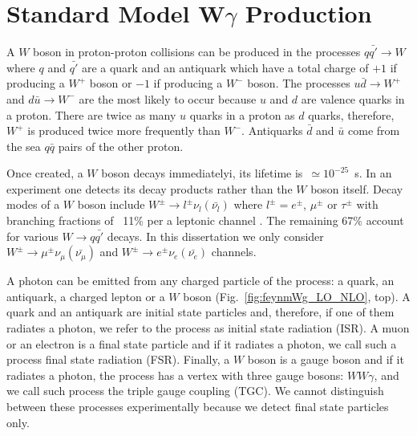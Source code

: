 \section{Standard Model W$\gamma$ Production}
\label{sec:WgAbout_SMproduction}

A $W$ boson in proton-proton collisions can be produced in the processes $q {\bar{q'}} \rightarrow W$ where $q$ and $\bar{q'}$ are a quark and an antiquark which have a total charge of $+1$ if producing a $W^+$ boson or $-1$ if producing a $W^-$ boson. The processes $u\bar{d}\rightarrow W^+$ and $d\bar{u}\rightarrow W^-$ are the most likely to occur because $u$ and $d$ are valence quarks in a proton. There are twice as many $u$ quarks in a proton as $d$ quarks, therefore, $W^+$ is produced twice more frequently than $W^-$. Antiquarks $\bar{d}$ and $\bar{u}$ come from the sea $q\bar{q}$ pairs of the other proton.

Once created, a $W$ boson decays immediatelyi, its lifetime is~$\simeq 10^{-25}$~s. In an experiment one detects its decay products rather than the $W$ boson itself. Decay modes of a $W$ boson include $W^\pm \rightarrow l^\pm \nu_l ({\bar{\nu_l}})$ where $l^\pm=e^\pm$, $\mu^\pm$ or $\tau^\pm$ with branching fractions of ~11\% per a leptonic channel \cite{ref_PDG}. The remaining 67\% account for various $W\rightarrow q\bar{q'}$ decays. In this dissertation we only consider $W^\pm \rightarrow \mu^\pm \nu_\mu ({\bar{\nu_\mu}})$ and $W^\pm \rightarrow e^\pm \nu_e ({\bar{\nu_e}})$ channels.


A photon can be emitted from any charged particle of the process: a quark, an antiquark, a charged lepton or a $W$ boson (Fig.~\ref{fig:feynmWg_LO_NLO}, top). A quark and an antiquark are initial state particles and, therefore, if one of them radiates a photon, we refer to the process as initial state radiation (ISR). A muon or an electron is a final state particle and if it radiates a photon, we call such a process final state radiation (FSR). Finally, a $W$ boson is a gauge boson and if it radiates a photon, the process has a vertex with three gauge bosons: $WW\gamma$, and we call such process the triple gauge coupling (TGC). We cannot distinguish between these processes experimentally because we detect final state particles only.

